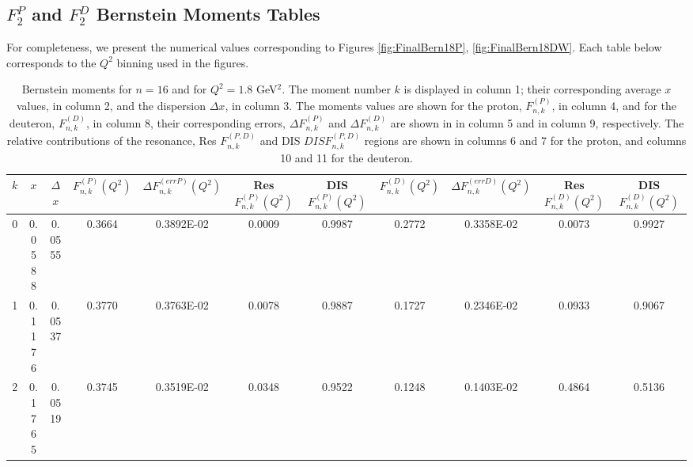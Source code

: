 \documentclass[
twocolumn,
aps,prd,
nofootinbib,
superscriptaddress,
showpacs,ligh
tightenlines, 
]{revtex4}
\begin{document}
\begin{widetext}
\appendix
\section{$F_2^P$ and $F_2^D$ Bernstein Moments Tables}
\label{app_a}
For completeness, we present the numerical values corresponding to Figures \ref{fig:FinalBern18P}, \ref{fig:FinalBern18DW}. Each table below corresponds to the $Q^2$ binning used in the figures. 

 \begin{table}[h]
\begin{center}
\caption{Bernstein moments for $n=16$ and for $Q^{2} = 1.8$ GeV$^{2}$. The moment number $k$ is displayed in column 1; their corresponding average $x$ values, in column 2, and the dispersion $\Delta x$, in column 3. The moments values are shown for the proton, $F_{n,k}^{(P)}$, in column 4, and for the deuteron, $F_{n,k}^{(D)}$, in column 8, their corresponding errors, $\Delta F_{n,k}^{(P)}$ and $\Delta F_{n,k}^{(D)}$ are shown in in column 5 and in column 9, respectively. The relative contributions of the resonance,  Res $F_{n,k}^{(P,D)}$ and DIS $DIS F_{n,k}^{(P,D)}$ regions are shown in columns 6 and 7 for the proton, and columns 10 and 11 for the deuteron.}
\begin{tabular}{|c|c|c|c|c|c|c|c|c|c|c|}
\hline
\hline
  $k$  & $x$   & $\Delta$ $x$   &  $F_{n,k}^{(P)}(Q^{2})$  & $\Delta F_{n,k}^{(err P )}(Q^{2})$ &  Res $F_{n,k}^{(P)}(Q^{2})$  & DIS     $F_{n,k}^{(P)}(Q^{2})$  &   $F_{n,k}^{(D)}(Q^{2})$  & $\Delta F_{n,k}^{(err D )}(Q^{2})$ &  Res $F_{n,k}^{(D)}(Q^{2})$  & DIS     $F_{n,k}^{(D)}(Q^{2})$        \\
\hline
\hline
   0                &        0.0588             &        0.0555             &     0.3664                 &     0.3892E-02             &        0.0009             &        0.9987             & 0.2772 & 0.3358E-02 & 0.0073 & 0.9927 \\
      1                 &        0.1176             &        0.0537             &     0.3770                 &     0.3763E-02             &        0.0078             &        0.9887             & 0.1727 & 0.2346E-02 & 0.0933 & 0.9067 \\
      2                 &        0.1765             &        0.0519             &     0.3745                 &     0.3519E-02             &        0.0348             &        0.9522             & 0.1248 & 0.1403E-02 & 0.4864 & 0.5136 \\

\end{tabular}
\end{center}
\end{table}
\end{widetext}
\end{document}
